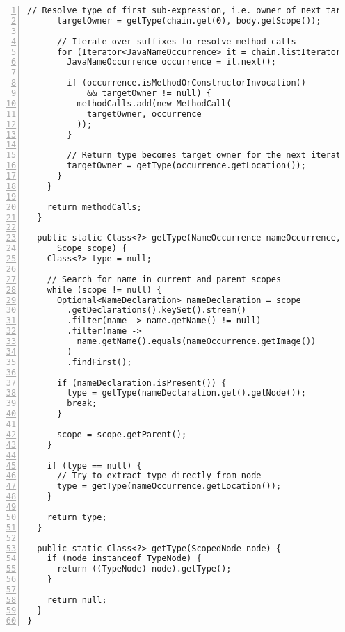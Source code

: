 \begin{lstlisting}[caption={Utility class which attempts to extract the required information about method calls from the Abstract Syntax Tree.}, captionpos=b, label=lst:pmd_util, numbers=left, showstringspaces=false]
      // Resolve type of first sub-expression, i.e. owner of next target method
      targetOwner = getType(chain.get(0), body.getScope());

      // Iterate over suffixes to resolve method calls
      for (Iterator<JavaNameOccurrence> it = chain.listIterator(1); it.hasNext();) {
        JavaNameOccurrence occurrence = it.next();

        if (occurrence.isMethodOrConstructorInvocation()
            && targetOwner != null) {
          methodCalls.add(new MethodCall(
            targetOwner, occurrence
          ));
        }

        // Return type becomes target owner for the next iteration
        targetOwner = getType(occurrence.getLocation());
      }
    }

    return methodCalls;
  }

  public static Class<?> getType(NameOccurrence nameOccurrence,
      Scope scope) {
    Class<?> type = null;

    // Search for name in current and parent scopes
    while (scope != null) {
      Optional<NameDeclaration> nameDeclaration = scope
        .getDeclarations().keySet().stream()
        .filter(name -> name.getName() != null)
        .filter(name -> 
          name.getName().equals(nameOccurrence.getImage())
        )
        .findFirst();

      if (nameDeclaration.isPresent()) {
        type = getType(nameDeclaration.get().getNode());
        break;
      }

      scope = scope.getParent();
    }

    if (type == null) {
      // Try to extract type directly from node
      type = getType(nameOccurrence.getLocation());
    }

    return type;
  }

  public static Class<?> getType(ScopedNode node) {
    if (node instanceof TypeNode) {
      return ((TypeNode) node).getType();
    }

    return null;
  }
}
\end{lstlisting}

